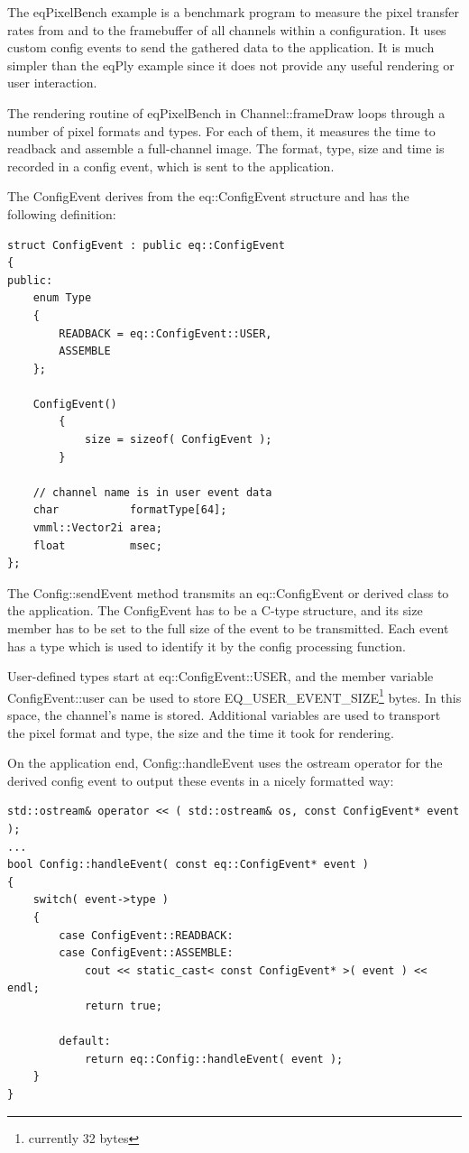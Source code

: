 \documentclass[10pt,a4]{scrartcl}
\begin{document}
The \textsf{eqPixelBench} example is a benchmark program to measure the
pixel transfer rates from and to the framebuffer of all channels within
a configuration. It uses custom config events to send the gathered data
to the application. It is much simpler than the \textsf{eqPly} example
since it does not provide any useful rendering or user interaction.

The rendering routine of \textsf{eqPixelBench} in
\textsf{Channel::frameDraw} loops through a number of pixel formats and
types. For each of them, it measures the time to readback and assemble a
full-channel image. The format, type, size and time is recorded in a
config event, which is sent to the application.

The \textsf{ConfigEvent} derives from the \textsf{eq::ConfigEvent}
structure and has the following definition:

{\footnotesize\begin{lstlisting}
struct ConfigEvent : public eq::ConfigEvent
{
public:
    enum Type
    {
        READBACK = eq::ConfigEvent::USER,
        ASSEMBLE
    };

    ConfigEvent()
        {
            size = sizeof( ConfigEvent );
        }

    // channel name is in user event data
    char           formatType[64];
    vmml::Vector2i area;
    float          msec;
};
\end{lstlisting}}

The \textsf{Config::sendEvent} method transmits an
\textsf{eq::ConfigEvent} or derived class to the application. The
ConfigEvent has to be a C-type structure, and its \textsf{size}
member has to be set to the full size of the event to be transmitted.
Each event has a type which is used to identify it by the config 
processing function.

User-defined types start at \textsf{eq::ConfigEvent::USER}, and the
member variable \textsf{ConfigEvent::user} can be used to store
\textsf{EQ\_USER\_EVENT\_SIZE}\footnote{currently 32 bytes} bytes. In
this space, the channel's name is stored. Additional variables are used
to transport the pixel format and type, the size and the time it took
for rendering.

On the application end, \textsf{Config::handleEvent} uses the
\textsf{ostream} operator for the derived config event to output these
events in a nicely formatted way:

{\footnotesize\begin{lstlisting}
std::ostream& operator << ( std::ostream& os, const ConfigEvent* event );
...
bool Config::handleEvent( const eq::ConfigEvent* event )
{
    switch( event->type )
    {
        case ConfigEvent::READBACK:
        case ConfigEvent::ASSEMBLE:
            cout << static_cast< const ConfigEvent* >( event ) << endl;
            return true;

        default:
            return eq::Config::handleEvent( event );
    }
}
\end{lstlisting}}%
\end{document}
